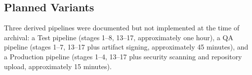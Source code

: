 \subsection{Planned Variants}

Three derived pipelines were documented but not implemented at the time of archival:
a Test pipeline (stages 1--8, 13--17, approximately one hour), a QA pipeline (stages
1--7, 13--17 plus artifact signing, approximately 45 minutes), and a Production pipeline
(stages 1--4, 13--17 plus security scanning and repository upload, approximately
15 minutes).

